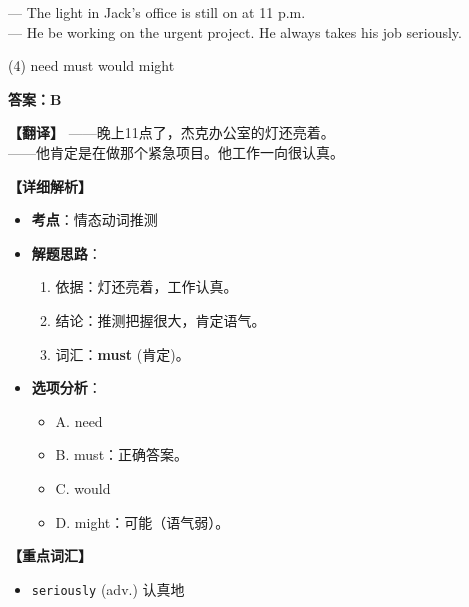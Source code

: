 \documentclass[11pt, a4paper]{article}
\newcommand{\analysis}[4]{
    \begin{solutionbox}
        \textbf{答案：#1}
        
        \textbf{【翻译】} #2
        
        \textbf{【详细解析】}
        #3
        
        \textbf{【重点词汇】}
        #4
    \end{solutionbox}
}
\newcommand{\blank}{\underline{\hspace{1.5cm}}}
\begin{document}
\begin{questions}
    \item — The light in Jack’s office is still on at 11 p.m. \\
    — He \blank be working on the urgent project. He always takes his job seriously.
    \begin{tasks}(4)
        \task need \task must \task would \task might
    \end{tasks}
    \analysis{B}{——晚上11点了，杰克办公室的灯还亮着。\\——他肯定是在做那个紧急项目。他工作一向很认真。}{
        \begin{itemize}
            \item \textbf{考点}：情态动词推测
            \item \textbf{解题思路}：
                \begin{enumerate}
                    \item 依据：灯还亮着，工作认真。
                    \item 结论：推测把握很大，肯定语气。
                    \item 词汇：\textbf{must} (肯定)。
                \end{enumerate}
            \item \textbf{选项分析}：
                \begin{itemize}
                    \item A. need
                    \item B. must：正确答案。
                    \item C. would
                    \item D. might：可能（语气弱）。
                \end{itemize}
        \end{itemize}
    }{
        \begin{itemize}
            \item \texttt{seriously} (adv.) 认真地
        \end{itemize}
    }


\end{questions}
\end{document}
